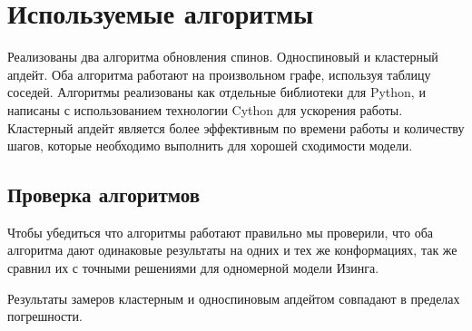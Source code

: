 \section{Используемые алгоритмы}

Реализованы два алгоритма обновления спинов. Односпиновый и кластерный апдейт. Оба алгоритма работают на произвольном графе, используя таблицу соседей. Алгоритмы реализованы как отдельные библиотеки для Python, и написаны с использованием технологии Cython для ускорения работы. Кластерный апдейт является более эффективным по времени работы и количеству шагов, которые необходимо выполнить для хорошей сходимости модели.

\subsection{Проверка алгоритмов}

Чтобы убедиться что алгоритмы работают правильно мы проверили, что оба алгоритма дают одинаковые результаты на одних и тех же конформациях, так же сравнил их с точными решениями для одномерной модели Изинга.

Результаты замеров кластерным и односпиновым апдейтом совпадают в пределах погрешности.

